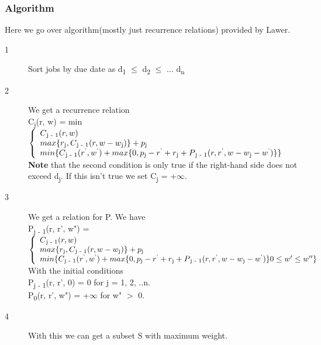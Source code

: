 \documentclass[11pt]{article}
\begin{document}
{				\subsubsection{Algorithm}
				Here we go over algorithm(mostly just recurrence relations) provided by Lawer. \citet{Lawler1990}
				\begin{description}
					\item[1] Sort jobs by due date as d\textsubscript{1} $\leq$ d\textsubscript{2} $\leq$ ... d\textsubscript{n}
					\item[2] We get a recurrence relation \citet{Lawler1990}\\ C\textsubscript{j}(r, w) = min
					\begin{math}
					\left\{
					\begin{array}{l}
					C\textsubscript{j - 1}(r, w)\\
					max \{r\textsubscript{j}, C\textsubscript{j - 1}(r, w - w\textsubscript{j})\} + p\textsubscript{j}\\
					min \{C\textsubscript{j - 1}(r\textsuperscript{'}, w\textsuperscript{'}) + max \{0, p\textsubscript{j} - r\textsuperscript{'} + r\textsubscript{j} + P\textsubscript{j - 1}(r, r\textsuperscript{'}, w - w\textsubscript{j} - w\textsuperscript{'})\}\}
					\end{array}
					\right.
					\end{math}
					\\\textbf{Note} that the second condition is only true if the right-hand side does not exceed d\textsubscript{j}. If this isn't true we set C\textsubscript{j} = +$\infty$.
					\item[3] We get a relation for P. We have \citet{Lawler1990} \\ P\textsubscript{j - 1}(r, r', w") = 
					\begin{math}
					\left\{
					\begin{array}{l}
					C\textsubscript{j - 1}(r, w)\\
					max \{r\textsubscript{j}, C\textsubscript{j - 1}(r, w - w\textsubscript{j})\} + p\textsubscript{j}\\
					min \{C\textsubscript{j - 1}(r\textsuperscript{'}, w\textsuperscript{'}) + max \{0, p\textsubscript{j} - r\textsuperscript{'} + r\textsubscript{j} + P\textsubscript{j - 1}(r, r\textsuperscript{'}, w - w\textsubscript{j} - w\textsuperscript{'})\} 0  \leq w' \leq w''\}
					\end{array}
					\right.
					\end{math}\\
					With the initial conditions\\P\textsubscript{j - 1}(r, r', 0) = 0 for j = 1, 2, ..n.\\P\textsubscript{0}(r, r', w") = +$\infty$ for w" $>$ 0.
					\item[4] With this we can get a subset S with maximum weight.
				\end{description}
				
}
\end{document}
